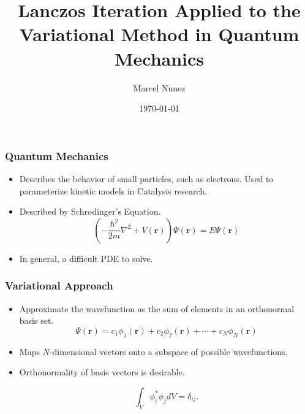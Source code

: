 \documentclass[]{beamer}
\title{Lanczos Iteration Applied to the Variational Method in Quantum Mechanics}
\author{Marcel Nunez}
\institute{CHEG 827}
\date{\today}
\begin{document}
\begin{frame}
  \titlepage
\end{frame}



\begin{frame}
  \frametitle{Quantum Mechanics} 

  \begin{itemize}
  \item<1-> Describes the behavior of small particles, such as electrons. Used to parameterize kinetic models in Catalysis research.
  \item<2-> Described by Schrodinger's Equation.
  \begin{equation*}
  \left( - \frac{\hbar ^2}{2m} \nabla ^2 + V(\textbf{r}) \right) \Psi (\textbf{r}) = E \Psi (\textbf{r})
  \end{equation*}
  \item<3-> In general, a difficult PDE to solve.
  \end{itemize}
  
\end{frame}



\begin{frame}
  \frametitle{Variational Approach}  

  \begin{itemize}
  \item<1-> Approximate the wavefunction as the sum of elements in an orthonormal basis set.
  \begin{equation*}
  \Psi(\textbf{r}) = c_1 \phi_1(\textbf{r}) +  c_2 \phi_2(\textbf{r}) + \cdots + c_N \phi_N(\textbf{r})
  \end{equation*}
  \item<2-> Maps $N$-dimensional vectors onto a subspace of possible wavefunctions.
  \item<3-> Orthonormality of basis vectors is desirable.
    
  \begin{equation*}
      \int_V \phi_i^*\phi_j dV = \delta_{ij}.
      \end{equation*}
    \end{itemize}
  
\end{frame}
\end{document}
